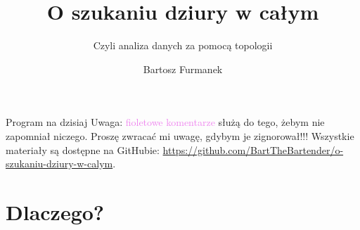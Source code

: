 \documentclass{beamer}
\title{O szukaniu dziury w całym}
\subtitle{Czyli analiza danych za pomocą topologii}
\author{Bartosz Furmanek}
\date{}
\newcommand{\comment}[1]{\textcolor{violet}{#1}}
\begin{document}
\begin{frame}
    \titlepage 
\end{frame}

\begin{frame}{Program na dzisiaj}
    \tableofcontents
    Uwaga: \comment{fioletowe komentarze} służą do tego, żebym nie zapomniał niczego.
    Proszę zwracać mi uwagę, gdybym je zignorował!!!
    Wszystkie materiały są dostępne na GitHubie:
    \href{https://github.com/BartTheBartender/o-szukaniu-dziury-w-calym}{https://github.com/BartTheBartender/o-szukaniu-dziury-w-calym}.
\end{frame}

\section{Dlaczego?}
\end{document}
